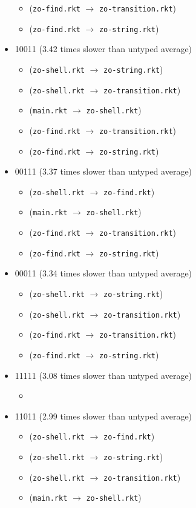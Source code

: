 \documentclass{article}
\newcommand{\mono}[1]{\texttt{#1}}
\begin{document}
\begin{itemize}
\begin{itemize}
  \item (\mono{zo-find.rkt} $\rightarrow$ \mono{zo-transition.rkt})
  \item (\mono{zo-find.rkt} $\rightarrow$ \mono{zo-string.rkt})
  \end{itemize}
\item 10011 (3.42 times slower than untyped average)
  \begin{itemize}
  \item (\mono{zo-shell.rkt} $\rightarrow$ \mono{zo-string.rkt})
  \item (\mono{zo-shell.rkt} $\rightarrow$ \mono{zo-transition.rkt})
  \item (\mono{main.rkt} $\rightarrow$ \mono{zo-shell.rkt})
  \item (\mono{zo-find.rkt} $\rightarrow$ \mono{zo-transition.rkt})
  \item (\mono{zo-find.rkt} $\rightarrow$ \mono{zo-string.rkt})
  \end{itemize}
\item 00111 (3.37 times slower than untyped average)
  \begin{itemize}
  \item (\mono{zo-shell.rkt} $\rightarrow$ \mono{zo-find.rkt})
  \item (\mono{main.rkt} $\rightarrow$ \mono{zo-shell.rkt})
  \item (\mono{zo-find.rkt} $\rightarrow$ \mono{zo-transition.rkt})
  \item (\mono{zo-find.rkt} $\rightarrow$ \mono{zo-string.rkt})
  \end{itemize}
\item 00011 (3.34 times slower than untyped average)
  \begin{itemize}
  \item (\mono{zo-shell.rkt} $\rightarrow$ \mono{zo-string.rkt})
  \item (\mono{zo-shell.rkt} $\rightarrow$ \mono{zo-transition.rkt})
  \item (\mono{zo-find.rkt} $\rightarrow$ \mono{zo-transition.rkt})
  \item (\mono{zo-find.rkt} $\rightarrow$ \mono{zo-string.rkt})
  \end{itemize}
\item 11111 (3.08 times slower than untyped average)
  \begin{itemize}
  \item 
  \end{itemize}
\item 11011 (2.99 times slower than untyped average)
  \begin{itemize}
  \item (\mono{zo-shell.rkt} $\rightarrow$ \mono{zo-find.rkt})
  \item (\mono{zo-shell.rkt} $\rightarrow$ \mono{zo-string.rkt})
  \item (\mono{zo-shell.rkt} $\rightarrow$ \mono{zo-transition.rkt})
  \item (\mono{main.rkt} $\rightarrow$ \mono{zo-shell.rkt})
  \end{itemize}


\end{itemize}
\end{document}
